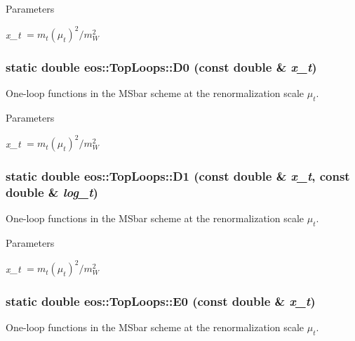 \begin{DoxyParams}{Parameters}
\item[{\em x\_\-t}]$= m_t(\mu_t)^2 / m_W^2$ \end{DoxyParams}
\hypertarget{structeos_1_1TopLoops_ab2d0294c1731e85f1fa2576fdcbda692}{
\subsubsection[{D0}]{\setlength{\rightskip}{0pt plus 5cm}static double eos::TopLoops::D0 (const double \& {\em x\_\-t})}}
\label{structeos_1_1TopLoops_ab2d0294c1731e85f1fa2576fdcbda692}
One-\/loop functions in the MSbar scheme at the renormalization scale $\mu_t$.


\begin{DoxyParams}{Parameters}
\item[{\em x\_\-t}]$= m_t(\mu_t)^2 / m_W^2$ \end{DoxyParams}
\hypertarget{structeos_1_1TopLoops_a116720ebeb9dfa7f83c68adcc053b74f}{
\subsubsection[{D1}]{\setlength{\rightskip}{0pt plus 5cm}static double eos::TopLoops::D1 (const double \& {\em x\_\-t}, \/  const double \& {\em log\_\-t})}}
\label{structeos_1_1TopLoops_a116720ebeb9dfa7f83c68adcc053b74f}
One-\/loop functions in the MSbar scheme at the renormalization scale $\mu_t$.


\begin{DoxyParams}{Parameters}
\item[{\em x\_\-t}]$= m_t(\mu_t)^2 / m_W^2$ \end{DoxyParams}
\hypertarget{structeos_1_1TopLoops_acc27faf5debf5f4b70d2690c10af4f2c}{
\subsubsection[{E0}]{\setlength{\rightskip}{0pt plus 5cm}static double eos::TopLoops::E0 (const double \& {\em x\_\-t})}}
\label{structeos_1_1TopLoops_acc27faf5debf5f4b70d2690c10af4f2c}
One-\/loop functions in the MSbar scheme at the renormalization scale $\mu_t$.



